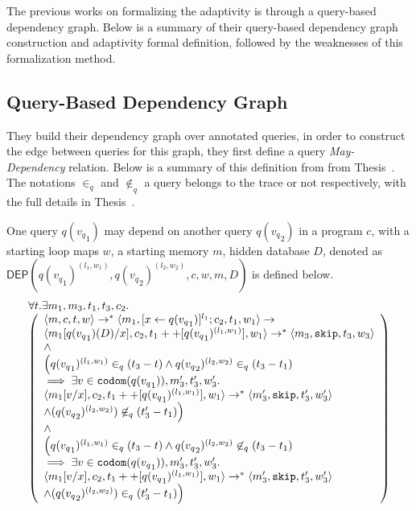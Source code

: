 The previous works on formalizing the adaptivity is through a query-based dependency graph.
Below is a summary of their query-based dependency graph construction and adaptivity formal definition, followed
by the weaknesses of this formalization method.
\subsection*{Query-Based Dependency Graph}
They build their dependency graph over annotated queries, in order to construct the edge between queries for this graph, they first
define a query \emph{May-Dependency} relation. Below is a summary of this definition from
from Thesis~\cite{weihao22}.
The notations $\in_q$ and $\not\in_q$ a query belongs to the trace or not respectively, with the full details in Thesis~\cite{weihao22}.
\begin{defn}
One query $q({v_q}_1)$ may depend on another query $q({v_q}_2)$ in a program $c$, with a starting loop maps $w$, a starting memory $m$, hidden database $D$, denoted as \\
$\mathsf{DEP}(q({v_q}_1)^{(l_1, w_1)}, q({v_q}_2)^{(l_2, w_2)}, c,w, m, D)$ is defined below. 
\[
\begin{array}{l}
\forall  t. \exists m_1,m_3,t_1,t_3,c_2.\\
  \left (\begin{array}{l}   
\config{m, c,  t,w} \rightarrow^{*} \config{m_1, [\assign{x}{q({v_q}_1)}]^{l_1} ; c_2,
  t_1,w_1} \rightarrow \\ \config{m_1[q({v_q}_1)(D)/x], c_2,
  t_1++[q({v_q}_1)^{(l_1, w_1)}], w_1} \rightarrow^{*} \config{m_3, \eskip,
  t_3,w_3} \\  
  \land \\
\Big( q({v_q}_1)^{(l_1,w_1)} \in_{q} (t_3-t) \land q({v_q}_2)^{(l_2,w_2)} \in_{q} (t_3-t_1) \\ \implies  \exists v \in \codom(q({v_q}_1)), m_3', t_3', w_3'.  \\
 \config{m_1[v/x], {c_2}, t_1++[q({v_q}_1)^{(l_1,w_1)}], w_1} \rightarrow^{*} \config{m_3', \eskip, t_3', w_3'} \\ \land (q({v_q}_2)^{(l_2,w_2)}) \not \in_{q} (t_3'-t_1)
\Big)\\
\land \\
\Big(q({v_q}_1)^{(l_1,w_1)} \in_{q} (t_3-t) \land q({v_q}_2)^{(l_2,w_2)} \not\in_{q} (t_3-t_1) \\ \implies  \exists v \in \codom(q({v_q}_1)),  m_3', t_3', w_3'. \\
 \config{m_1[v/x], {c_2}, t_1++[q({v_q}_1)^{(l_1,w_1)}], w_1} \rightarrow^{*} \config{m_3', \eskip, t_3', w_3'} \\ \land (q({v_q}_2)^{(l_2,w_2)})  \in_{q} (t_3'-t_1)
\Big)
\end{array} \right )
\end{array}
\]
\end{defn}

